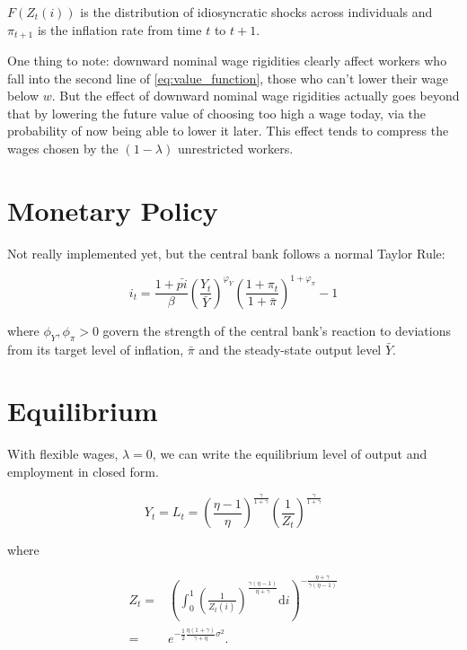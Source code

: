\documentclass[12pt,a4paper]{scrartcl}            %
\begin{document}
$F(Z_t(i))$ is the distribution of idiosyncratic shocks across individuals and $\pi_{t+1}$ is the inflation rate from time $t$ to $t+1$.

One thing to note: downward nominal wage rigidities clearly affect workers who fall into the second line of \ref{eq:value_function}, those who can't lower their wage below $w$.
But the effect of downward nominal wage rigidities actually goes beyond that by lowering the future value of choosing too high a wage today, via the probability of now being able to lower it later.
This effect tends to compress the wages chosen by the $(1 - \lambda)$ unrestricted workers.

\section{Monetary Policy}
\label{sec:monetary_policy}

Not really implemented yet, but the central bank follows a normal Taylor Rule:

\begin{equation}
    \label{eq:taylor_rule}
    i_t = \frac{1 + \bar{pi}}{\beta} \left( \frac{Y_t}{\bar{Y}} \right)^{\varphi_Y} \left( \frac{1 + \pi_t}{1 + \bar{\pi}} \right)^{1 + \varphi_{\pi}} - 1
\end{equation}

where $\phi_Y, \phi_{\pi} > 0$ govern the strength of the central bank's reaction to deviations from its target level of inflation, $\bar{\pi}$ and the steady-state output level $\bar{Y}$.

\section{Equilibrium}
\label{sec:equilibrium}

With flexible wages, $\lambda = 0$, we can write the equilibrium level of output and employment in closed form.

\begin{equation}
    \label{eq:output_flexible}
    Y_t = L_t = \left( \frac{\eta - 1}{\eta} \right)^{\frac{\gamma}{1 + \gamma}} \left( \frac{1}{Z_t} \right)^{\frac{\gamma}{1 + \gamma}}
\end{equation}

where

\begin{align}
    Z_t =& \left( \int_{0}^{1}\! \left( \frac{1}{Z_t(i)} \right)^{\frac{\gamma(\eta - 1)}{\eta + \gamma}} \mathrm{d}i \right)^{-\frac{\eta + \gamma}{\gamma(\eta - 1)}}\\
        =& e^{-\frac{1}{2} \frac{\eta(1 + \gamma)}{\gamma + \eta}\sigma^2 }.
\end{align}
\end{document}
